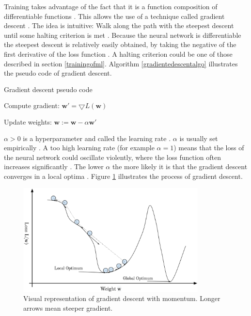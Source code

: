 \documentclass[draft,final,oneside]{vutinfth} %
\begin{document}
Training takes advantage of the fact that it is a function composition of differentiable functions \cite{Goodfellow-et-al-2016}. This allows the use of a technique called gradient descent \cite{anintroductiontoneuralnetworks}. The idea is intuitive: Walk along the path with the steepest descent until some halting criterion is met \cite{anintroductiontoneuralnetworks}. Because the neural network is differentiable the steepest descent is relatively easily obtained, by taking the negative of the first derivative of the loss function \cite{Goodfellow-et-al-2016}. A halting criterion could be one of those described in section \ref{trainingofml}. Algorithm \ref{gradientedescentalgo} illustrates the pseudo code of gradient descent.

\begin{algorithm}
\caption{Gradient descent pseudo code \cite{anintroductiontoneuralnetworks}}\label{gradientedescentalgo}
 {
Compute gradient: $\boldsymbol{w}' = \bigtriangledown	L(\boldsymbol{w})$

Update weights: $\boldsymbol{w} := \boldsymbol{w} - \alpha \boldsymbol{w}'$
}

\end{algorithm}

$\alpha > 0$ is a hyperparameter and called the learning rate \cite{Goodfellow-et-al-2016}. $\alpha$ is usually set empirically \cite{Goodfellow-et-al-2016}. A too high learning rate (for example $\alpha = 1$) means that the loss of the neural network could oscillate  violently, where the loss function often increases significantly \cite{Goodfellow-et-al-2016}. The lower $\alpha$ the more likely it is that the gradient descent converges in a local optima \cite{Goodfellow-et-al-2016}. Figure \ref{fig:gradientdescent} illustrates the process of gradient descent. %

\begin{figure}[ht]
	\centering
  	\includegraphics[width=0.85\textwidth]{graphics/gradientdescent.png}
	\caption{Visual representation of gradient descent with momentum. Longer arrows mean steeper gradient. \cite{Goodfellow-et-al-2016}}
	\label{fig:gradientdescent}
\end{figure}
\end{document}
